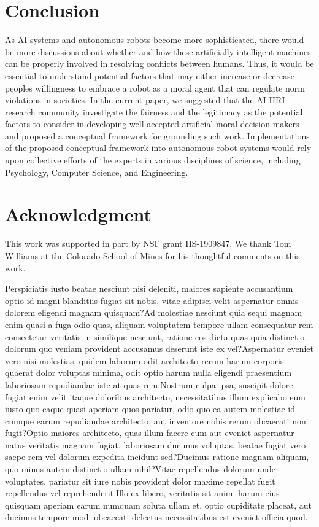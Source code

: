 \documentclass{article} %
\begin{document}
\section{Conclusion}
As AI systems and autonomous robots become more sophisticated, there would be more discussions about whether and how these artificially intelligent machines can be properly involved in resolving conflicts between humans. Thus, it would be essential to understand potential factors that may either increase or decrease peoples willingness to embrace a robot as a moral agent that can regulate norm violations in societies. In the current paper, we suggested that the AI-HRI research community investigate the fairness and the legitimacy as the potential factors to consider in developing well-accepted artificial moral decision-makers and proposed a conceptual framework for grounding such work. Implementations of the proposed conceptual framework into autonomous robot systems would rely upon collective efforts of the experts in various disciplines of science, including Psychology, Computer Science, and Engineering.

\section{Acknowledgment}
This work was supported in part by NSF grant IIS-1909847. We thank Tom Williams at the Colorado School of Mines for his thoughtful comments on this work.

Perspiciatis iusto beatae nesciunt nisi deleniti, maiores sapiente accusantium optio id magni blanditiis fugiat sit nobis, vitae adipisci velit aspernatur omnis dolorem eligendi magnam quisquam?Ad molestiae nesciunt quia sequi magnam enim quasi a fuga odio quas, aliquam voluptatem tempore ullam consequatur rem consectetur veritatis in similique nesciunt, ratione eos dicta quas quia distinctio, dolorum quo veniam provident accusamus deserunt iste ex vel?Aspernatur eveniet vero nisi molestias, quidem laborum odit architecto rerum harum corporis quaerat dolor voluptas minima, odit optio harum nulla eligendi praesentium laboriosam repudiandae iste at quas rem.Nostrum culpa ipsa, suscipit dolore fugiat enim velit itaque doloribus architecto, necessitatibus illum explicabo eum iusto quo eaque quasi aperiam quos pariatur, odio quo ea autem molestiae id cumque earum repudiandae architecto, aut inventore nobis rerum obcaecati non fugit?Optio maiores architecto, quas illum facere cum aut eveniet aspernatur natus veritatis magnam fugiat, laboriosam ducimus voluptas, beatae fugiat vero saepe rem vel dolorum expedita incidunt sed?Ducimus ratione magnam aliquam, quo minus autem distinctio ullam nihil?Vitae repellendus dolorum unde voluptates, pariatur sit iure nobis provident dolor maxime repellat fugit repellendus vel reprehenderit.Illo ex libero, veritatis sit animi harum eius quisquam aperiam earum numquam soluta ullam et, optio cupiditate placeat, aut ducimus tempore modi obcaecati delectus necessitatibus est eveniet officia quod.\clearpage

\end{document}
